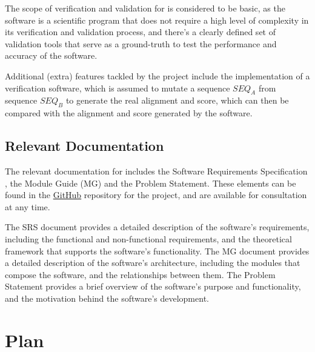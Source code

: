 \documentclass[12pt, titlepage]{article}
\begin{document}
The scope of verification and validation for \progname{} is considered to be 
basic, as the software is a scientific program that does not require a high level
of complexity in its verification and validation process, and there's a clearly 
defined set of validation tools that serve as a ground-truth to test the performance 
and accuracy of the software.

Additional (extra) features tackled by the project include the implementation of 
a verification software, which is assumed to mutate a sequence $SEQ_A$ from sequence
$SEQ_B$ to generate the real alignment and score, which can then be compared with
the alignment and score generated by the \progname{} software.

\subsection{Relevant Documentation}

The relevant documentation for \progname{} includes the Software Requirements Specification \citet{SRS},
the Module Guide (MG) and the Problem Statement. These elements can be found in the \href{https://github.com/UGarCil/UGarcil_capstone}{GitHub}  
repository for the project, and are available for consultation at any time.

The SRS document provides a detailed description of the software's requirements, including the
functional and non-functional requirements, and the theoretical framework that supports the software's
functionality. The MG document provides a detailed description of the software's architecture, including
the modules that compose the software, and the relationships between them. The Problem Statement provides
a brief overview of the software's purpose and functionality, and the motivation behind the software's
development.




\section{Plan}
\end{document}
